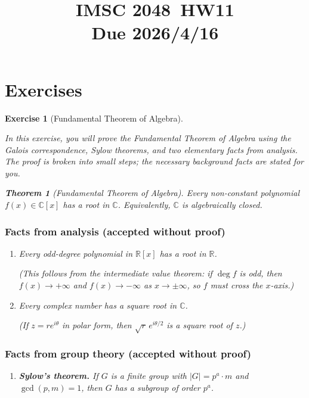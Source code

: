 \documentclass{article}
\title{IMSC 2048\ HW11 \\ Due 2026/4/16}
\newtheorem{exer}{Exercise}
\newtheorem{thm}{Theorem}
\newcommand{\C}{\mathbb{C}}
\newcommand{\R}{\mathbb{R}}
\begin{document}
\maketitle


\section{Exercises}

\begin{exer}[Fundamental Theorem of Algebra]\label{exer:FTA}

In this exercise, you will prove the Fundamental Theorem of Algebra using the Galois correspondence, Sylow theorems, and two elementary facts from analysis. The proof is broken into small steps; the necessary background facts are stated for you.

\begin{thm}[Fundamental Theorem of Algebra]\label{thm:FTA}
Every non-constant polynomial $f(x) \in \C[x]$ has a root in $\C$. Equivalently, $\C$ is algebraically closed.
\end{thm}

\subsubsection*{Facts from analysis (accepted without proof)}

\begin{enumerate}
\item[\textbf{(A1)}] \emph{Every odd-degree polynomial in $\R[x]$ has a root in $\R$.}

(This follows from the intermediate value theorem: if $\deg f$ is odd, then $f(x)\to +\infty$ and $f(x)\to -\infty$ as $x\to\pm\infty$, so $f$ must cross the $x$-axis.)

\item[\textbf{(A2)}] \emph{Every complex number has a square root in $\C$.}

(If $z=re^{i\theta}$ in polar form, then $\sqrt{r}\,e^{i\theta/2}$ is a square root of $z$.)
\end{enumerate}

\subsubsection*{Facts from group theory (accepted without proof)}

\begin{enumerate}
\item[\textbf{(G1)}] \textbf{Sylow's theorem.} If $G$ is a finite group with $|G|=p^a\cdot m$ and $\gcd(p,m)=1$, then $G$ has a subgroup of order $p^a$.


\end{enumerate}
\end{exer}
\end{document}

